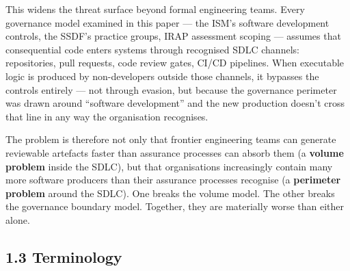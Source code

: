 \documentclass[a4paper,11pt]{report}
\begin{document}
This widens the threat surface beyond formal engineering teams. Every
governance model examined in this paper --- the ISM's software
development controls, the SSDF's practice groups, IRAP assessment
scoping --- assumes that consequential code enters systems through
recognised SDLC channels: repositories, pull requests, code review
gates, CI/CD pipelines. When executable logic is produced by
non-developers outside those channels, it bypasses the controls entirely
--- not through evasion, but because the governance perimeter was drawn
around ``software development'' and the new production doesn't cross
that line in any way the organisation recognises.

The problem is therefore not only that frontier engineering teams can
generate reviewable artefacts faster than assurance processes can absorb
them (a \textbf{volume problem} inside the SDLC), but that organisations
increasingly contain many more software producers than their assurance
processes recognise (a \textbf{perimeter problem} around the SDLC). One
breaks the volume model. The other breaks the governance boundary model.
Together, they are materially worse than either alone.

\hypertarget{terminology}{%
\subsection{1.3 Terminology}\label{terminology}}
\end{document}
